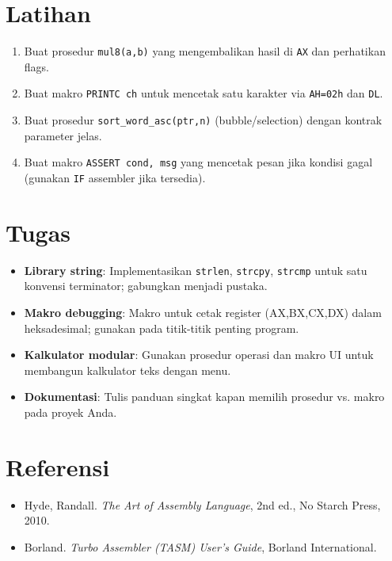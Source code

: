 \section{Latihan}
\begin{enumerate}
  \item Buat prosedur \texttt{mul8(a,b)} yang mengembalikan hasil di \texttt{AX} dan perhatikan flags.
  \item Buat makro \texttt{PRINTC ch} untuk mencetak satu karakter via \texttt{AH=02h} dan \texttt{DL}.
  \item Buat prosedur \texttt{sort\_word\_asc(ptr,n)} (bubble/selection) dengan kontrak parameter jelas.
  \item Buat makro \texttt{ASSERT cond, msg} yang mencetak pesan jika kondisi gagal (gunakan \texttt{IF} assembler jika tersedia).
\end{enumerate}

\section{Tugas}
\begin{itemize}
  \item \textbf{Library string}: Implementasikan \texttt{strlen}, \texttt{strcpy}, \texttt{strcmp} untuk satu konvensi terminator; gabungkan menjadi pustaka.
  \item \textbf{Makro debugging}: Makro untuk cetak register (AX,BX,CX,DX) dalam heksadesimal; gunakan pada titik-titik penting program.
  \item \textbf{Kalkulator modular}: Gunakan prosedur operasi dan makro UI untuk membangun kalkulator teks dengan menu.
  \item \textbf{Dokumentasi}: Tulis panduan singkat kapan memilih prosedur vs. makro pada proyek Anda.
\end{itemize}

\section{Referensi}
\begin{itemize}
  \item Hyde, Randall. \textit{The Art of Assembly Language}, 2nd ed., No Starch Press, 2010.
  \item Borland. \textit{Turbo Assembler (TASM) User's Guide}, Borland International.
\end{itemize}
